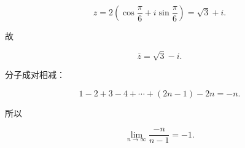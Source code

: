 \begin{answer}

\nopagebreak[4]
\[
z=2\left(\cos\frac\pi6+i\sin\frac\pi6\right)
=\sqrt3+i.
\]

故

\nopagebreak[4]
\[
\overline z=\sqrt3-i.
\]


分子成对相减：

\nopagebreak[4]
\[
1-2+3-4+\cdots+(2n-1)-2n=-n.
\]

所以

\nopagebreak[4]
\[
\lim_{n\to\infty}\frac{-n}{n-1}=-1.
\]






\end{answer}
